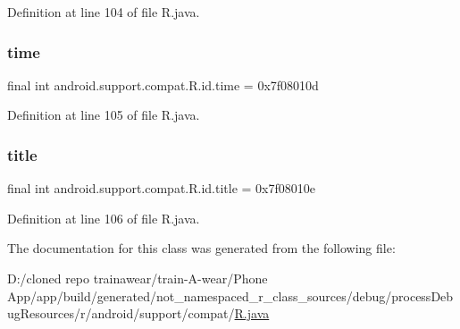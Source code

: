 Definition at line 104 of file R.\+java.

\mbox{\label{classandroid_1_1support_1_1compat_1_1_r_1_1id_a49cf2219fd53fac400ba97ac46a60f87}} 
\subsubsection{\texorpdfstring{time}{time}}
{\footnotesize\ttfamily final int android.\+support.\+compat.\+R.\+id.\+time = 0x7f08010d\hspace{0.3cm}{\ttfamily [static]}}



Definition at line 105 of file R.\+java.

\mbox{\label{classandroid_1_1support_1_1compat_1_1_r_1_1id_a40ae774b3537286b4a997e8cbb09e476}} 
\subsubsection{\texorpdfstring{title}{title}}
{\footnotesize\ttfamily final int android.\+support.\+compat.\+R.\+id.\+title = 0x7f08010e\hspace{0.3cm}{\ttfamily [static]}}



Definition at line 106 of file R.\+java.



The documentation for this class was generated from the following file\+:\begin{DoxyCompactItemize}
\item 
D\+:/cloned repo trainawear/train-\/\+A-\/wear/\+Phone App/app/build/generated/not\+\_\+namespaced\+\_\+r\+\_\+class\+\_\+sources/debug/process\+Debug\+Resources/r/android/support/compat/\mbox{\hyperlink{process_debug_resources_2r_2android_2support_2compat_2_r_8java}{R.\+java}}\end{DoxyCompactItemize}
